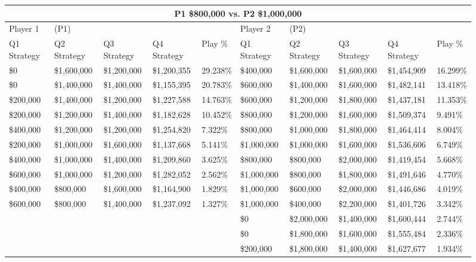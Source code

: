 \documentclass[11pt]{article}
\begin{document}
\begin{figure}
\tiny
\begin{tabular}{ |p{1.0cm}p{1.0cm}p{1.0cm}p{2.0cm}|p{1.0cm}||p{1.0cm}p{1.0cm}p{1.0cm}p{2.0cm}|p{1.0cm}|}
\hline
\multicolumn{10}{|c|}{P1 \$800,000 vs. P2 \$1,000,000} \\
\hline
Player 1 & (P1) & & & & Player 2 & (P2) & & & \\
\hline
Q1 Strategy & Q2 Strategy & Q3 Strategy & Q4 Strategy  &  Play \% & Q1 Strategy & Q2 Strategy & Q3 Strategy & Q4 Strategy  &  Play \%\\
\hline
\$0 & \$1,600,000 & \$1,200,000 & \$1,200,355 & 29.238\% & \$400,000 & \$1,600,000 & \$1,600,000 & \$1,454,909 & 16.299\% \\
\$0 & \$1,400,000 & \$1,400,000 & \$1,155,395 & 20.783\% & \$600,000 & \$1,400,000 & \$1,600,000 & \$1,482,141 & 13.418\% \\
\$200,000 & \$1,400,000 & \$1,200,000 & \$1,227,588 & 14.763\% & \$600,000 & \$1,200,000 & \$1,800,000 & \$1,437,181 & 11.353\% \\
\$200,000 & \$1,200,000 & \$1,400,000 & \$1,182,628 & 10.452\% & \$800,000 & \$1,200,000 & \$1,600,000 & \$1,509,374 & 9.491\% \\
\$400,000 & \$1,200,000 & \$1,200,000 & \$1,254,820 & 7.322\% & \$800,000 & \$1,000,000 & \$1,800,000 & \$1,464,414 & 8.004\% \\
\$200,000 & \$1,000,000 & \$1,600,000 & \$1,137,668 & 5.141\% & \$1,000,000 & \$1,000,000 & \$1,600,000 & \$1,536,606 & 6.749\% \\
\$400,000 & \$1,000,000 & \$1,400,000 & \$1,209,860 & 3.625\% & \$800,000 & \$800,000 & \$2,000,000 & \$1,419,454 & 5.668\% \\
\$600,000 & \$1,000,000 & \$1,200,000 & \$1,282,052 & 2.562\% & \$1,000,000 & \$800,000 & \$1,800,000 & \$1,491,646 & 4.770\% \\
\$400,000 & \$800,000 & \$1,600,000 & \$1,164,900 & 1.829\% & \$1,000,000 & \$600,000 & \$2,000,000 & \$1,446,686 & 4.019\% \\
\$600,000 & \$800,000 & \$1,400,000 & \$1,237,092 & 1.327\% & \$1,000,000 & \$400,000 & \$2,200,000 & \$1,401,726 & 3.342\% \\
&&&& & \$0 & \$2,000,000 & \$1,400,000 & \$1,600,444 & 2.744\% \\
&&&& & \$0 & \$1,800,000 & \$1,600,000 & \$1,555,484 & 2.336\% \\
&&&& & \$200,000 & \$1,800,000 & \$1,400,000 & \$1,627,677 & 1.934\% \\

\end{tabular}
\end{figure}
\end{document}
